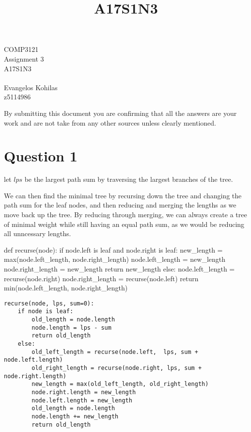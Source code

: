 \documentclass{article}
\title{A17S1N3}
\begin{document}
\begin{center}
    \begin{LARGE}
        COMP3121\\
        Assignment 3\\
        A17S1N3\\
        \hrulefill\\
        Evangelos Kohilas\\
        z5114986\\
        \hrulefill
    \end{LARGE}

    \begin{large}
        By submitting this document you are confirming that all the answers are your work and are not take from any other sources unless clearly mentioned.
    \end{large}

\end{center}

\section*{Question 1}
let $lps$ be the largest path sum by traversing the largest branches of the tree.

We can then find the minimal tree by recursing down the tree and changing the path sum for the leaf nodes, and then reducing and merging the lengths as we move back up the tree. By reducing through merging, we can always create a tree of minimal weight while still having an equal path sum, as we would be reducing all unncessary lengths.

def recurse(node):
    if node.left is leaf and node.right is leaf:
        new_length = max(node.left_length, node.right_length)
        node.left_length = new_length
        node.right_length = new_length
        return new_length
    else:
        node.left_length = recurse(node.right)
        node.right_length = recurse(node.left)
        return min(node.left_length, node.right_length)

\begin{verbatim}
recurse(node, lps, sum=0):
    if node is leaf:
        old_length = node.length
        node.length = lps - sum
        return old_length
    else:
        old_left_length = recurse(node.left,  lps, sum + node.left.length)
        old_right_length = recurse(node.right, lps, sum + node.right.length)
        new_length = max(old_left_length, old_right_length)
        node.right.length = new_length
        node.left.length = new_length
        old_length = node.length
        node.length += new_length
        return old_length
\end{verbatim}
\end{document}
